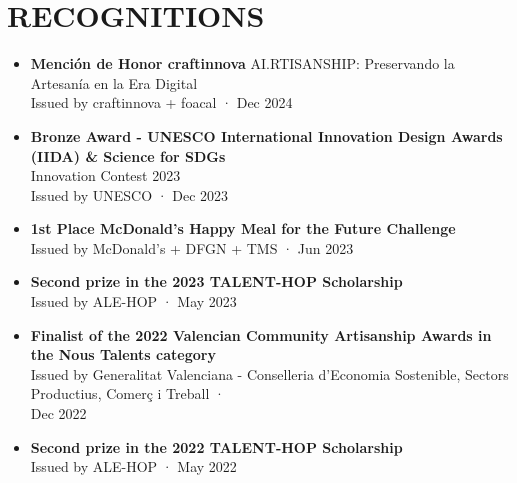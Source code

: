 \documentclass[11pt,a4paper]{article}
\begin{document}
\section*{RECOGNITIONS}
\begin{itemize}[leftmargin=*,label={},itemsep=2pt]
    \item \textbf{Mención de Honor craftinnova} AI.RTISANSHIP: Preservando la Artesanía en la Era Digital\\
    Issued by craftinnova + foacal · Dec 2024
    
    \item \textbf{Bronze Award - UNESCO International Innovation Design Awards (IIDA) \& Science for SDGs}\\
    Innovation Contest 2023\\
    Issued by UNESCO · Dec 2023
    
    \item \textbf{1st Place McDonald's Happy Meal for the Future Challenge}\\
    Issued by McDonald's + DFGN + TMS · Jun 2023
    
    \item \textbf{Second prize in the 2023 TALENT-HOP Scholarship}\\
    Issued by ALE-HOP · May 2023
    
    \item \textbf{Finalist of the 2022 Valencian Community Artisanship Awards in the Nous Talents category}\\
    Issued by Generalitat Valenciana - Conselleria d'Economia Sostenible, Sectors Productius, Comerç i Treball ·\\
    Dec 2022
    
    \item \textbf{Second prize in the 2022 TALENT-HOP Scholarship}\\
    Issued by ALE-HOP · May 2022
\end{itemize}

\end{document}
